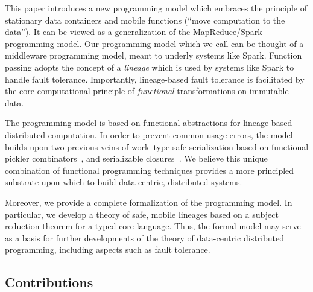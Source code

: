 \documentclass{jfp1}
\begin{document}
This paper introduces a new programming model which embraces the principle of
stationary data containers and mobile functions (``move computation to the data''). 
It can be viewed as a generalization of the MapReduce/Spark programming model. 
Our programming model which we call {\em\FP} can be thought of a middleware 
programming model, meant to underly systems like Spark. Function passing adopts the concept of a 
{\em lineage} which is used by systems like Spark to handle fault tolerance. 
Importantly, lineage-based fault tolerance is facilitated by the core computational 
principle of {\em functional} transformations on immutable data.

The programming model is based on functional abstractions for lineage-based
distributed computation. In order to prevent common usage errors, the model
builds upon two previous veins of work--type-safe serialization based on
functional pickler combinators~\cite{Kennedy2004,Elsman2005,Pickling,AliceML}, and
serializable closures~\cite{CloudHaskell,Spores}. We believe this unique
combination of functional programming techniques provides a more principled
substrate upon which to build data-centric, distributed systems.

Moreover, we provide a complete formalization of the programming model. In
particular, we develop a theory of safe, mobile lineages based on a subject
reduction theorem for a typed core language. Thus, the formal model may serve as
a basis for further developments of the theory of data-centric distributed
programming, including aspects such as fault tolerance.

\subsection{Contributions}
\end{document}
